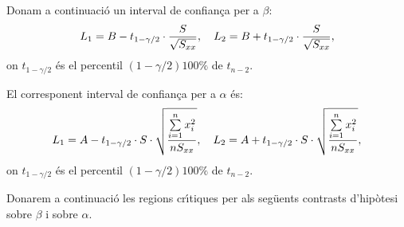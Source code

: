 Donam a continuaci\'o un interval de confian\c{c}a per a $\beta$:
$$L_1 = B - t_{1-\gamma/2} \cdot {S \over \sqrt{S_{xx}}}, \ \ \ L_2 = B +
t_{1-\gamma/2} \cdot {S \over \sqrt{S_{xx}}},$$
on $t_{1-\gamma/2}$ \'es el percentil $(1-\gamma/2) 100 \% $ de $t_{n-2}$.

El corresponent interval de confian\c ca per a $\alpha$ \'es:
$$L_1 = A - t_{1-\gamma/2} \cdot S \cdot \sqrt{{\sum\limits_{i=1}^n x_i^2 \over n
S_{xx}}}, \ \ \ L_2 = A + t_{1-\gamma/2} \cdot S \cdot \sqrt{{\sum\limits_{i=1}^n
x_i^2 \over n S_{xx}}},$$
on $t_{1-\gamma/2}$ \'es el percentil $(1-\gamma/2) 100 \% $ de $t_{n-2}$.

Donarem a continuaci\'o les regions cr\'{\i}tiques 
per als seg\"uents contrasts
d'hip\`otesi sobre $\beta$ i sobre $\alpha$.
